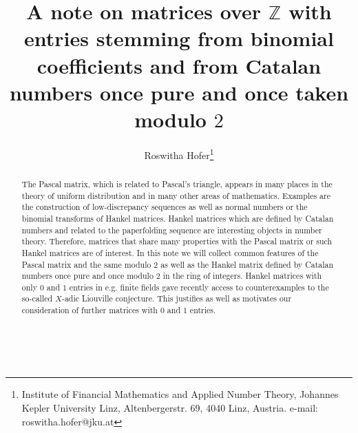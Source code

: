 \documentclass{article}
\newcommand{\ZZ}{\mathbb Z}
\begin{document}
\title{A note on matrices over $\ZZ$ with entries stemming from binomial coefficients and from Catalan numbers once pure and once taken modulo $2$}
\author{Roswitha Hofer\thanks{Institute of Financial Mathematics and Applied Number Theory, Johannes Kepler University Linz, Altenbergerstr. 69, 4040 Linz, Austria. e-mail: roswitha.hofer@jku.at}}



\maketitle
\begin{abstract}
The Pascal matrix, which is related to Pascal's triangle, appears in many places in the theory of uniform distribution and in many other areas of mathematics. Examples are the construction of low-discrepancy sequences as well as normal numbers or the binomial transforms of Hankel matrices. Hankel matrices which are defined by Catalan numbers and related to the paperfolding sequence are interesting objects in number theory. Therefore, matrices that share many properties with the Pascal matrix or such Hankel matrices are of interest. In this note we will collect common features of the Pascal matrix and the same modulo $2$ as well as the Hankel matrix defined by Catalan numbers once pure and once modulo $2$ in the ring of integers. Hankel matrices with only $0$ and $1$ entries in e.g. finite fields gave recently access to counterexamples to the so-called $X$-adic Liouville conjecture. This justifies as well as motivates our consideration of further matrices with $0$ and $1$ entries. 
\end{abstract}

\\
\end{document}

